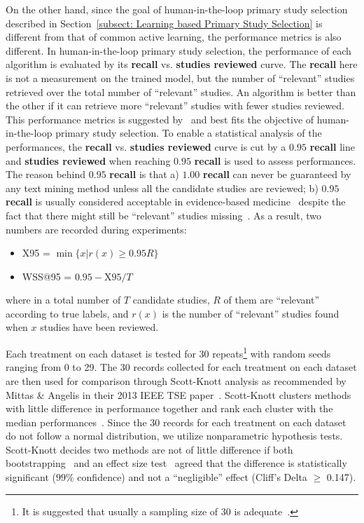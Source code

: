 \documentclass{svjour3}
\theoremstyle{break}
\begin{document}
On the other hand, since the goal of human-in-the-loop primary study selection described in Section~\ref{subsect: Learning based Primary Study Selection} is different from that of common active learning, the performance metrics is also different. In human-in-the-loop primary study selection, the performance of each algorithm is evaluated by its \textbf{recall} vs. \textbf{studies reviewed} curve. The \textbf{recall} here is not a measurement on the trained model, but the number of ``relevant'' studies retrieved over the total number of ``relevant'' studies. An algorithm is better than the other if it can retrieve more ``relevant'' studies with fewer studies reviewed. This performance metrics is suggested by~\cite{cormack2015autonomy,cormack2014evaluation,tredennick2015} and best fits the objective of human-in-the-loop primary study selection. To enable a statistical analysis of the performances, the \textbf{recall} vs. \textbf{studies reviewed} curve is cut by a $0.95$ \textbf{recall} line and \textbf{studies reviewed} when reaching $0.95$ \textbf{recall} is used to assess performances. The reason behind $0.95$ \textbf{recall} is that a) $1.00$ \textbf{recall} can never be guaranteed by any text mining method unless all the candidate studies are reviewed; b) $0.95$ \textbf{recall} is usually considered acceptable in evidence-based medicine~\cite{cohen2011performance,cohen2006reducing,o2015using} despite the fact that there might still be ``relevant'' studies missing~\cite{shemilt2016use}. As a result, two numbers are recorded during experiments:
\begin{itemize}
\item
X95 = $\min \{x | r(x)\geq0.95 R\}$
\item
WSS@95 = $0.95-\text{X95}/T$
\end{itemize}
where in a total number of $T$ candidate studies, $R$ of them are ``relevant'' according to true labels, and $r(x)$ is the number of ``relevant'' studies found when $x$ studies have been reviewed.

Each treatment on each dataset is tested for 30 repeats\footnote{It is suggested that usually a sampling size of $30$ is adequate~\cite{isotalo2001basics}.} with random seeds ranging from 0 to 29. The 30 records collected for each treatment on each dataset are then used for comparison through Scott-Knott analysis as recommended by Mittas \& Angelis in their 2013 IEEE TSE paper~\cite{mittas2013ranking}. Scott-Knott clusters methods with little difference in performance together and rank each cluster with the median performances~\cite{scott1974cluster}. Since the 30 records for each treatment on each dataset do not follow a normal distribution, we utilize nonparametric hypothesis tests. Scott-Knott decides two methods are not of little difference if both bootstrapping~\cite{efron1982jackknife} and an effect size test~\cite{cliff1993dominance} agreed that the difference is statistically significant ($99\%$
confidence) and not a “negligible” effect (Cliff's Delta $\ge$ 0.147).
\end{document}

